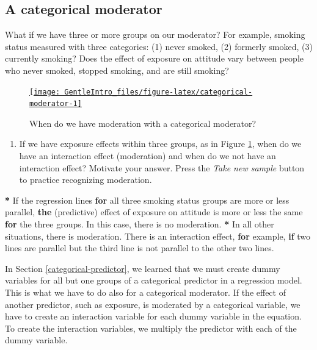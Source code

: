 \documentclass[a4paper]{book}
\newenvironment{Shaded}{\begin{snugshade}}{\end{snugshade}}
\newcommand{\KeywordTok}[1]{\textcolor[rgb]{0,0,0}{\textbf{#1}}}
\newcommand{\StringTok}[1]{\textcolor[rgb]{0.00,0.00,0.00}{#1}}
\newcommand{\ControlFlowTok}[1]{\textcolor[rgb]{0.00,0.00,0.00}{\textbf{#1}}}
\newcommand{\OperatorTok}[1]{\textcolor[rgb]{0.00,0.00,0.00}{\textbf{#1}}}
\newcommand{\NormalTok}[1]{#1}
\providecommand{\tightlist}{%
  \setlength{\itemsep}{0pt}\setlength{\parskip}{0pt}}
\theoremstyle{definition}
\theoremstyle{definition}
\theoremstyle{definition}
\theoremstyle{remark}
\begin{document}
\subsection{A categorical moderator}\label{a-categorical-moderator}

What if we have three or more groups on our moderator? For example,
smoking status measured with three categories: (1) never smoked, (2)
formerly smoked, (3) currently smoking? Does the effect of exposure on
attitude vary between people who never smoked, stopped smoking, and are
still smoking?

\begin{figure}[H]
\href{http://82.196.4.233:3838/apps/categorical-moderator/}{\texttt{[image: GentleIntro\_files/figure-latex/categorical-moderator-1]} }\caption{When do we have moderation with a categorical moderator?}\label{fig:categorical-moderator}
\end{figure}

\begin{enumerate}
\def\labelenumi{\arabic{enumi}.}
\tightlist
\item
  If we have exposure effects within three groups, as in Figure
  \ref{fig:categorical-moderator}, when do we have an interaction effect
  (moderation) and when do we not have an interaction effect? Motivate
  your answer. Press the \emph{Take new sample} button to practice
  recognizing moderation.
\end{enumerate}

\begin{Shaded}
\begin{Highlighting}[]
\OperatorTok{*}\StringTok{ }\NormalTok{If the regression lines }\ControlFlowTok{for}\NormalTok{ all three smoking status groups are more or less}
\NormalTok{parallel, }\KeywordTok{the}\NormalTok{ (predictive) effect of exposure on attitude is more or less the}
\NormalTok{same }\ControlFlowTok{for}\NormalTok{ the three groups. In this case, there is no moderation.}
\OperatorTok{*}\StringTok{ }\NormalTok{In all other situations, there is moderation. There is an interaction}
\NormalTok{effect, }\ControlFlowTok{for}\NormalTok{ example, }\ControlFlowTok{if}\NormalTok{ two lines are parallel but the third line is not}
\NormalTok{parallel to the other two lines.}
\end{Highlighting}
\end{Shaded}

In Section \ref{categorical-predictor}, we learned that we must create
dummy variables for all but one groups of a categorical predictor in a
regression model. This is what we have to do also for a categorical
moderator. If the effect of another predictor, such as exposure, is
moderated by a categorical variable, we have to create an interaction
variable for each dummy variable in the equation. To create the
interaction variables, we multiply the predictor with each of the dummy
variable.
\end{document}

